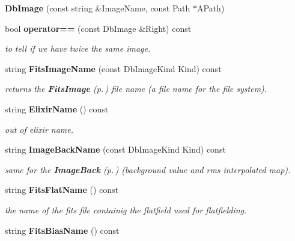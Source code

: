 \begin{CompactItemize}
\item 
{}
{\bf Db\-Image} (const string \&Image\-Name, const Path $\ast$APath)\label{class_dbimage_a6}

\item 
{}
bool {\bf operator==} (const Db\-Image \&Right) const\label{class_dbimage_a7}

\begin{CompactList}\small\item\em to tell if we have twice the same image.\item\end{CompactList}\item 
string {\bf Fits\-Image\-Name} (const Db\-Image\-Kind Kind) const
\begin{CompactList}\small\item\em returns the {\bf Fits\-Image} {\rm (p.\,\pageref{class_fitsimage})} file name (a file name for the file system).\item\end{CompactList}\item 
{}
string {\bf Elixir\-Name} () const\label{class_dbimage_a9}

\begin{CompactList}\small\item\em out of elixir name.\item\end{CompactList}\item 
string {\bf Image\-Back\-Name} (const Db\-Image\-Kind Kind) const
\begin{CompactList}\small\item\em same for the {\bf Image\-Back} {\rm (p.\,\pageref{class_imageback})} (background value and rms interpolated map).\item\end{CompactList}\item 
{}
string {\bf Fits\-Flat\-Name} () const\label{class_dbimage_a11}

\begin{CompactList}\small\item\em the name of the fits file containig the flatfield used for flatfielding.\item\end{CompactList}\item 
{}
string {\bf Fits\-Bias\-Name} () const\label{class_dbimage_a12}


\end{CompactItemize}
